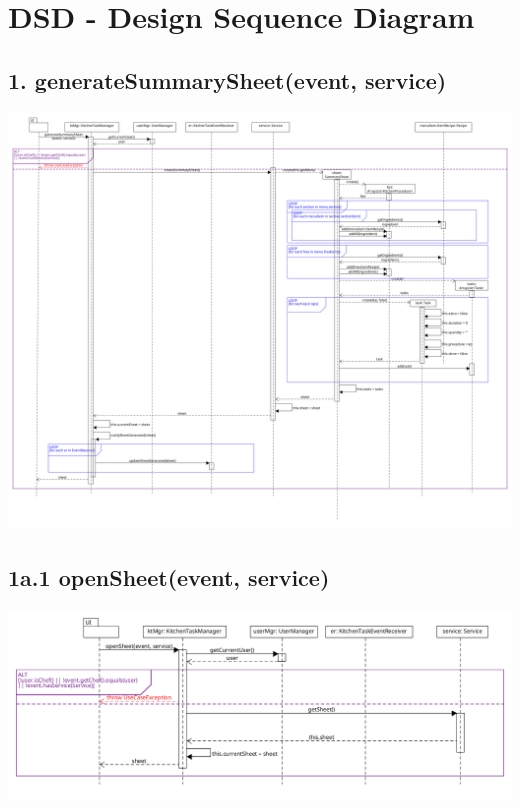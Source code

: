 \chapter{DSD - Design Sequence Diagram}

\section*{1. generateSummarySheet(event, service)}

\begin{center}
  \includegraphics[scale = 0.22]{images/DSD/DSD 1.png}
\end{center}

\section*{1a.1 openSheet(event, service)}

\begin{center}
  \includegraphics[scale = 0.35]{images/DSD/DSD 1a.png}
\end{center}


